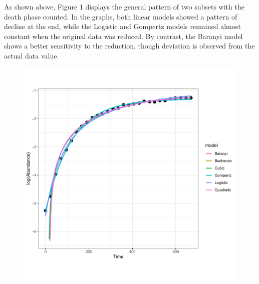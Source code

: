 \documentclass[11pt, oneside]{article}
\begin{document}
		\noindent As shown above, Figure 1 displays the general pattern of two subsets with the death phase counted. In the graphs, both linear models showed a pattern of decline at the end, while the Logistic and Gompertz models remained almost constant when the original data was reduced. By contrast, the Baranyi model shows a better sensitivity to the reduction, though deviation is observed from the actual data value. 
				
		\begin{figure}[H]
			\begin{center}
			\begin{minipage}{.5\textwidth}
				\centering
				\includegraphics[page=41, scale = 0.5]{plot_subsets.pdf}
			\end{minipage}%
			\begin{minipage}{.5\textwidth}
				\centering

\end{minipage}
\end{center}
\end{figure}
\end{document}
